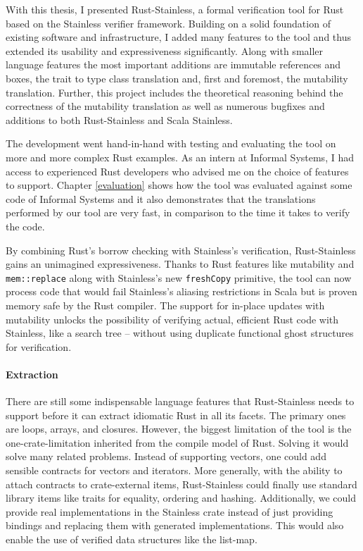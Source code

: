 With this thesis, I presented Rust-Stainless, a formal verification tool for Rust
based on the Stainless verifier framework. Building on a solid foundation of
existing software and infrastructure, I added many features to the tool and thus
extended its usability and expressiveness significantly. Along with smaller
language features the most important additions are immutable references and
boxes, the trait to  type class translation and, first and foremost, the
mutability translation. Further, this project includes the theoretical reasoning
behind the correctness of the mutability translation as well as numerous
bugfixes and additions to both Rust-Stainless and Scala Stainless.

The development went hand-in-hand with testing and evaluating the tool on more
and more complex Rust examples. As an intern at Informal Systems, I had access
to experienced Rust developers who advised me on the choice of features to
support. Chapter \ref{evaluation} shows how the tool was evaluated against some
code of Informal Systems and it also demonstrates that the translations
performed by our tool are very fast, in comparison to the time it takes to
verify the code.

By combining Rust's borrow checking with Stainless's verification,
Rust-Stainless gains an unimagined expressiveness. Thanks to Rust features like
mutability and \lstinline!mem::replace! along with Stainless's new
\lstinline!freshCopy! primitive, the tool can now process code that would fail
Stainless's aliasing restrictions in Scala but is proven memory safe by the Rust
compiler. The support for in-place updates with mutability unlocks the
possibility of verifying actual, efficient Rust code with Stainless, like a
search tree -- without using duplicate functional ghost structures for
verification.


\paragraph{Extraction}

There are still some indispensable language features that Rust-Stainless needs
to support before it can extract idiomatic Rust in all its facets. The primary
ones are loops, arrays, and closures. However, the biggest limitation of the
tool  is the one-crate-limitation inherited from the compile model of Rust.
Solving it would solve many related problems. Instead of supporting vectors, one
could add sensible contracts for vectors and iterators. More generally, with the
ability to attach contracts to crate-external items, Rust-Stainless could
finally  use standard library items like traits for equality, ordering and
hashing. Additionally, we could provide real implementations in the Stainless
crate instead of just providing bindings and replacing them with generated
implementations. This would also enable the use of verified data structures like
the list-map.

